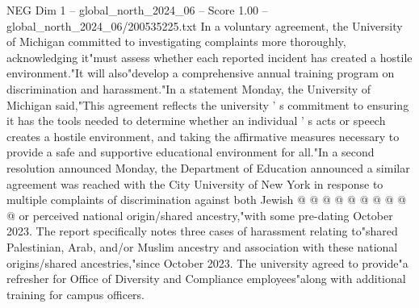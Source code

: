 \begin{textsample}{NEG Dim 1 – global\_north\_2024\_06 – Score 1.00 – global\_north\_2024\_06/200535225.txt}
In a voluntary agreement, the University of Michigan committed to investigating complaints more thoroughly, acknowledging it"must assess whether each reported incident has created a hostile environment."It will also"develop a comprehensive annual training program on discrimination and harassment."In a statement Monday, the University of Michigan said,"This agreement reflects the university ' s commitment to ensuring it has the tools needed to determine whether an individual ' s acts or speech creates a hostile environment, and taking the affirmative measures necessary to provide a safe and supportive educational environment for all."In a second resolution announced Monday, the Department of Education announced a similar agreement was reached with the City University of New York in response to multiple complaints of discrimination against both Jewish @ @ @ @ @ @ @ @ @ @ or perceived national origin/shared ancestry,"with some pre-dating October 2023.
The report specifically notes three cases of harassment relating to"shared Palestinian, Arab, and/or Muslim ancestry and association with these national origins/shared ancestries,"since October 2023.
The university agreed to provide"a refresher for Office of Diversity and Compliance employees"along with additional training for campus officers.

\end{textsample}
